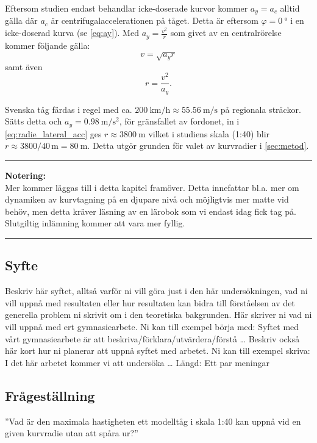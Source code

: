 Eftersom studien endast behandlar icke-doserade kurvor kommer $a_y=a_c$ alltid gälla där $a_c$ är centrifugalaccelerationen på tåget. Detta är eftersom $\varphi=\SI{0}{\degree}$ i en icke-doserad kurva (se \cref{eq:ay}). Med $a_y= \frac{v^2}{r}$ som givet av en centralrörelse kommer följande gälla:
\begin{equation}
    v=\sqrt{a_y r}
\end{equation}
samt även
\begin{equation}
    r=\frac{v^2}{a_y}.
    \label{eq:radie_lateral_acc}
\end{equation}

Svenska tåg färdas i regel med ca. $\SI{200}{\kilo\meter\per\hour} \approx \SI{55.56}{\m\per\s}$ på regionala sträckor. Sätts detta och $a_y=\SI{0.98}{\m\per\s\squared}$, för gränsfallet av fordonet, in i \cref{eq:radie_lateral_acc} ges $r\approx \SI{3800}{\m}$ vilket i studiens skala (1:40) blir $r\approx 3800/40\,\unit{\m} = \SI{80}{\m}$. Detta utgör grunden för valet av kurvradier i \cref{sec:metod}.

\begin{center}
    \hrule
    {\large\textbf{Notering:}} \\
    Mer kommer läggas till i detta kapitel framöver. Detta innefattar bl.a. mer om dynamiken av kurvtagning på en djupare nivå och möjligtvis mer matte vid behöv, men detta kräver läsning av en lärobok som vi endast idag fick tag på. Slutgiltig inlämning kommer att vara mer fyllig.
    \hrule
\end{center}

\subsection{Syfte}
Beskriv här syftet, alltså varför ni vill göra just i den här undersökningen, vad ni vill uppnå med resultaten eller hur resultaten kan bidra till förståelsen av det generella problem ni skrivit om i den teoretiska bakgrunden. Här skriver ni vad ni vill uppnå med ert gymnasiearbete. Ni kan till exempel börja med: Syftet med vårt gymnasiearbete är att beskriva/förklara/utvärdera/förstå … Beskriv också här kort hur ni planerar att uppnå syftet med arbetet. Ni kan till exempel skriva: I det här arbetet kommer vi att undersöka …
Längd: Ett par meningar

\subsection{Frågeställning}
''Vad är den maximala hastigheten ett modelltåg i skala 1:40 kan uppnå vid en given kurvradie utan att spåra ur?''

